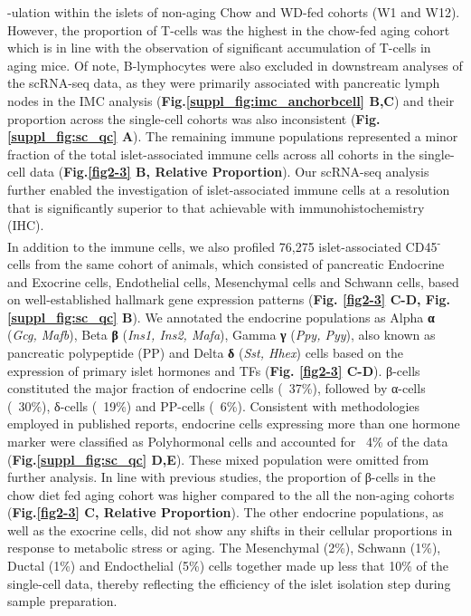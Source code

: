  -ulation within the islets of non-aging Chow and WD-fed cohorts (W1 and W12). However, the proportion of T-cells was the highest in the chow-fed aging cohort which is in line with the observation of significant accumulation of T-cells in aging mice. Of note, B-lymphocytes were also excluded in downstream analyses of the scRNA-seq data, as they were primarily associated with pancreatic lymph nodes in the IMC analysis (\textbf{Fig.\ref{suppl_fig:imc_anchorbcell} B,C}) and their proportion across the single-cell cohorts was also inconsistent (\textbf{Fig.\ref{suppl_fig:sc_qc} A}). The remaining immune populations represented a minor fraction of the total islet-associated immune cells across all cohorts in the single-cell data (\textbf{Fig.\ref{fig2-3} B, Relative Proportion}). Our scRNA-seq analysis further enabled the investigation of islet-associated immune cells at a resolution that is significantly superior to that achievable with immunohistochemistry (IHC).\\


In addition to the immune cells, we also profiled 76,275 islet-associated CD45\textsuperscript{-} cells from the same cohort of animals, which consisted of pancreatic Endocrine and Exocrine cells, Endothelial cells, Mesenchymal cells and Schwann cells, based on well-established hallmark gene expression patterns (\textbf{Fig. \ref{fig2-3} C-D, Fig.\ref{suppl_fig:sc_qc} B}). We annotated the endocrine populations as Alpha \textbf{α} (\textit{Gcg, Mafb}), Beta \textbf{β} (\textit{Ins1, Ins2, Mafa}), Gamma \textbf{γ} (\textit{Ppy, Pyy}), also known as pancreatic polypeptide (PP) and Delta \textbf{δ} (\textit{Sst, Hhex}) cells based on the expression of primary islet hormones and TFs (\textbf{Fig. \ref{fig2-3} C-D}). β-cells constituted the major fraction of endocrine cells (~37\%), followed by α-cells (~30\%), δ-cells (~19\%) and PP-cells (~6\%). Consistent with methodologies employed in published reports, endocrine cells expressing more than one hormone marker were classified as Polyhormonal cells and accounted for ~4\% of the data (\textbf{Fig.\ref{suppl_fig:sc_qc} D,E}). These mixed population were omitted from further analysis. In line with previous studies, the proportion of β-cells in the chow diet fed aging cohort was higher compared to the all the non-aging cohorts (\textbf{Fig.\ref{fig2-3} C, Relative Proportion}). The other endocrine populations, as well as the exocrine cells, did not show any shifts in their cellular proportions in response to metabolic stress or aging. The Mesenchymal (2\%), Schwann (1\%), Ductal (1\%) and Endocthelial (5\%) cells together made up less that 10\% of the single-cell data, thereby reflecting the efficiency of the islet isolation step during sample preparation. 

